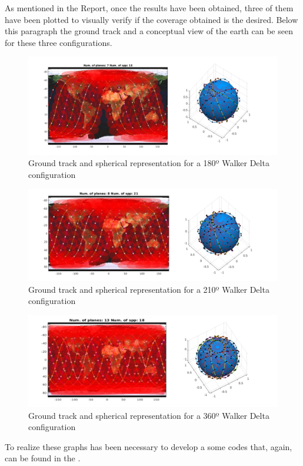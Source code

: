 As mentioned in the Report, once the results have been obtained, three of them have been plotted to visually verify if the coverage obtained is the desired. Below this paragraph the ground track and a conceptual view of the earth can be seen for these three configurations.

\begin{figure}[H] %
	\centering
	\includegraphics[width=1\textwidth]{./testing/WB180.png}
	\caption{Ground track and spherical representation for a 180º Walker Delta configuration}
	\label{fig:graph120}
\end{figure}

\begin{figure}[H] %
	\centering
	\includegraphics[width=1\textwidth]{./testing/WB210.png}
	\caption{Ground track and spherical representation for a 210º Walker Delta configuration}
	\label{fig:graph120}
\end{figure}

\begin{figure}[H] %
	\centering
	\includegraphics[width=1\textwidth]{./testing/WB360.png}
	\caption{Ground track and spherical representation for a 360º Walker Delta configuration}
	\label{fig:graph120}
\end{figure}

To realize these graphs has been necessary to develop a some codes that, again, can be found in the \cite[Chapter 1, Section 6]{annex6}.
